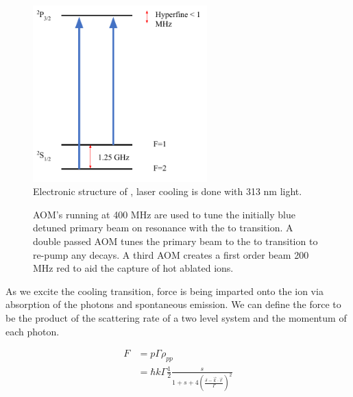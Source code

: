 \begin{figure}[H]
	\centering
	\includegraphics[width=0.6\textwidth]{images/Be_cooling.pdf}
	\caption{Electronic structure of , laser cooling is done with 313 nm light.}
	\label{fig: Be structure}
\end{figure}

\begin{figure}[H]
	\centering
	\caption{AOM's running at 400 MHz are used to tune the initially blue detuned primary beam on resonance with the  to  transition. A double passed AOM tunes the primary beam to the  to  transition to re-pump any  decays. A third AOM creates a first order beam 200 MHz red to aid the capture of hot ablated  ions.}
	\label{fig: AOMs}
\end{figure}

As we excite the cooling transition, force is being imparted onto the ion via absorption of the photons and spontaneous emission. We can define the force to be the product of the scattering rate of a two level system and the momentum of each photon.

\begin{align}
	F & = p \Gamma \rho_{pp} \nonumber \\
	& = \hbar k \Gamma \frac{1}{2} \frac{s}{1+s+4\left(\frac{\delta-\vec{k}\cdot \vec{v}}{\Gamma}\right)^2} \label{eq: laser force}
\end{align}

